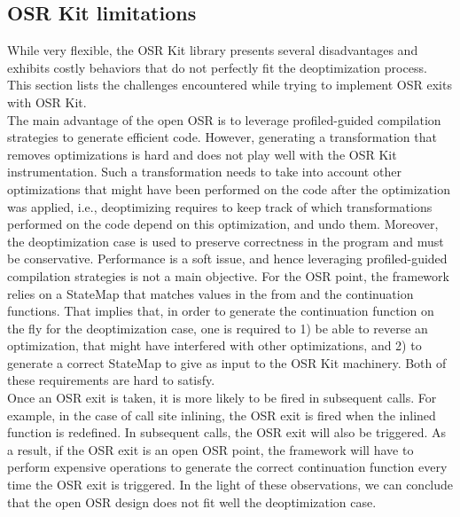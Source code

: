\subsection{OSR Kit limitations}\label{osrkitlimitations}

While very flexible, the OSR Kit\cite{OSRKit} library presents several disadvantages and exhibits costly behaviors that do not perfectly fit the deoptimization process.
This section lists the challenges encountered while trying to implement OSR exits with OSR Kit.\\

The main advantage of the open OSR is to leverage profiled-guided compilation strategies to generate efficient code.
However, generating a transformation that removes optimizations is hard and does not play well with the OSR Kit instrumentation.
Such a transformation needs to take into account other optimizations that might have been performed on the code after the optimization was applied, i.e., deoptimizing requires to keep track of which transformations performed on the code depend on this optimization, and undo them.
Moreover, the deoptimization case is used to preserve correctness in the program and must be conservative. 
Performance is a soft issue, and hence leveraging profiled-guided compilation strategies is not a main objective. 
For the OSR point, the framework relies on a StateMap that matches values in the from and the continuation functions.
That implies that, in order to generate the continuation function on the fly for the deoptimization case, one is required to 1) be able to reverse an optimization, that might have interfered with other optimizations, and 2) to generate a correct StateMap to give as input to the OSR Kit machinery.
Both of these requirements are hard to satisfy.\\

Once an OSR exit is taken, it is more likely to be fired in subsequent calls.
For example, in the case of call site inlining, the OSR exit is fired when the inlined function is redefined.
In subsequent calls, the OSR exit will also be triggered.
As a result, if the OSR exit is an open OSR point, the framework will have to perform expensive operations to generate the correct continuation function every time the OSR exit is triggered.
In the light of these observations, we can conclude that the open OSR design does not fit well the deoptimization case.\\

